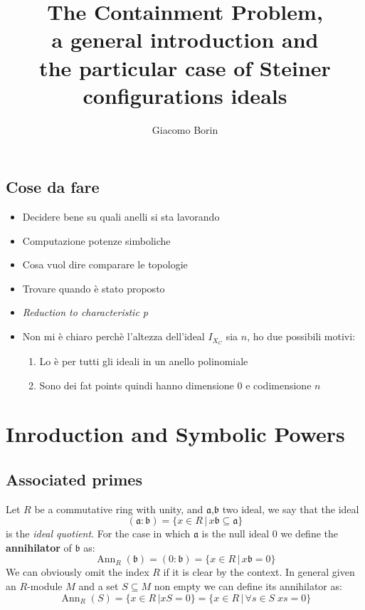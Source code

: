 \documentclass[]{book}
\title{The Containment Problem, 
\\a general introduction and 
\\the particular case of Steiner configurations ideals}
\author{Giacomo Borin}
\theoremstyle{plain}
\theoremstyle{remark}
\theoremstyle{definition}
\newcommand{\A}{\mathfrak{a}}
\newcommand{\B}{\mathfrak{b}}
\DeclareMathOperator{\Ann}{Ann}
\begin{document}
\frontmatter
\maketitle
\tableofcontents


\mainmatter

\section*{Cose da fare}
\begin{tcolorbox}
\begin{itemize}
\item Decidere bene su quali anelli si sta lavorando
\item Computazione potenze simboliche 
\item Cosa vuol dire comparare le topologie
\item Trovare quando è stato proposto 
\item \textit{Reduction to characteristic p}
\item Non mi è chiaro perchè l'altezza dell'ideal $ I_{X_C} $ sia $ n $, ho due possibili motivi:
\begin{enumerate}
\item Lo è per tutti gli ideali in un anello polinomiale
\item Sono dei fat points quindi hanno dimensione 0 e codimensione $ n $
\end{enumerate}
\end{itemize}
\end{tcolorbox}


\chapter{Inroduction and Symbolic Powers}


\section{Associated primes}

Let $ R $ be a commutative ring with unity, and $ \A $,$ \B $ two ideal, we say that the ideal
\begin{equation*}
	(\A : \B) = \{ x \in R \,|\, x\B \subseteq \A  \}
\end{equation*}
 \nocite{AMCD}
is the \textit{ideal quotient}. For the case in which $ \A $  is the null ideal $ 0 $ we define the \textbf{annihilator} of $ \B $ as:
\begin{equation*}
	\Ann_R(\B) = (0 : \B) = \{ x \in R \,|\, x\B = 0  \}
\end{equation*}
We can obviously omit the index $ R $ if it is clear by the context. In general given an $ R  $-module $ M $ and a set $ S \subseteq M $ non empty we can define its annihilator as:
\begin{equation*}
	\Ann_R (S) = \{ x \in R \,| xS = 0  \} = \{ x \in R \,|\, \forall s \in S \; xs = 0  \}
\end{equation*}
\end{document}
